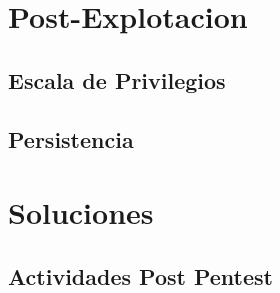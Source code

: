 \documentclass[a4paper]{article}%
\begin{document}
	\section{Post-Explotacion}

	\subsection{Escala de Privilegios}

	\subsection{Persistencia}

	\section{Soluciones}
		
		\subsection{Actividades Post Pentest}

	
\end{document}
